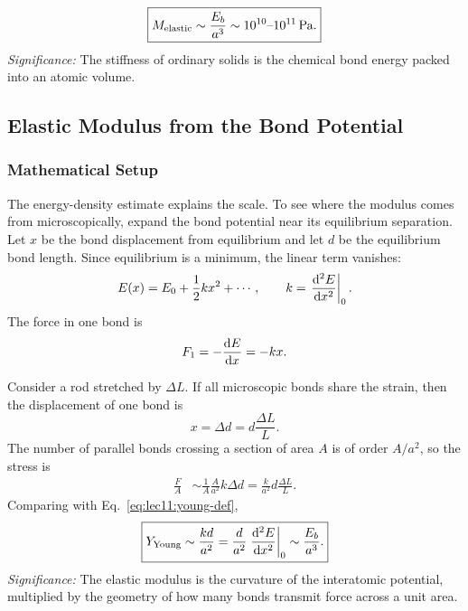 \begin{equation}
    \boxed{
    M_{\rm elastic}\sim \frac{E_b}{a^3}
    \sim 10^{10}\text{--}10^{11}\,\text{Pa}.
    }
    \label{eq:lec11:elastic-scale}
\end{equation}
\textit{Significance:} The stiffness of ordinary solids is the chemical bond
energy packed into an atomic volume.

\subsection{Elastic Modulus from the Bond Potential}
\label{sec:lec11:bond-curvature}

\subsubsection*{Mathematical Setup}
The energy-density estimate explains the scale. To see where the modulus comes
from microscopically, expand the bond potential near its equilibrium separation.
Let $x$ be the bond displacement from equilibrium and let $d$ be the equilibrium
bond length. Since equilibrium is a minimum, the linear term vanishes:
\begin{equation}
    E(x)=E_0+\frac{1}{2}kx^2+\cdots,
    \qquad
    k=\left.\dv[2]{E}{x}\right|_{0}.
    \label{eq:lec11:harmonic-bond}
\end{equation}
The force in one bond is
\begin{equation}
    F_1=-\dv{E}{x}=-kx.
    \label{eq:lec11:bond-force}
\end{equation}

Consider a rod stretched by $\Delta L$. If all microscopic bonds share the
strain, then the displacement of one bond is
\begin{equation}
    x=\Delta d=d\frac{\Delta L}{L}.
    \label{eq:lec11:micro-strain}
\end{equation}
The number of parallel bonds crossing a section of area $A$ is of order
$A/a^2$, so the stress is
\begin{align}
    \frac{F}{A}
    &\sim
    \frac{1}{A}\frac{A}{a^2}k\Delta d
    =
    \frac{k}{a^2}d\frac{\Delta L}{L}.
    \label{eq:lec11:stress-micro}
\end{align}
Comparing with Eq.~\eqref{eq:lec11:young-def},
\begin{equation}
    \boxed{
    Y_{\rm Young}\sim \frac{k d}{a^2}
    =
    \frac{d}{a^2}\left.\dv[2]{E}{x}\right|_0
    \sim \frac{E_b}{a^3}.
    }
    \label{eq:lec11:young-curvature}
\end{equation}
\textit{Significance:} The elastic modulus is the curvature of the interatomic
potential, multiplied by the geometry of how many bonds transmit force across a
unit area.


